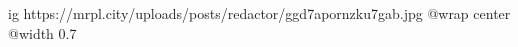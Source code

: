  
 
 
 
 

\ifcmt
  ig https://mrpl.city/uploads/posts/redactor/ggd7apornzku7gab.jpg
  @wrap center
  @width 0.7
\fi
